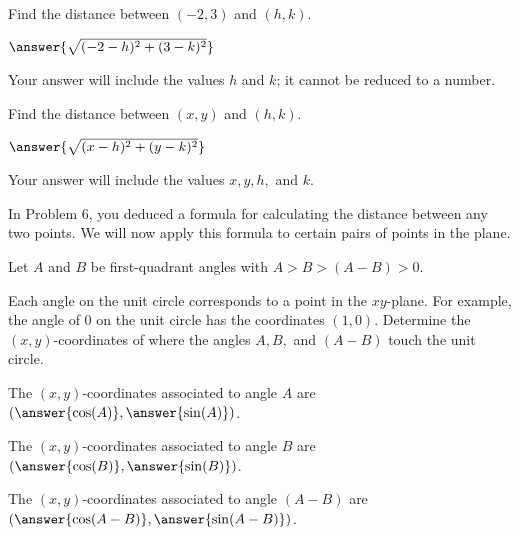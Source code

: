 \documentclass[number]{ximera}
\begin{document}
\begin{problem}
Find the distance between $(-2,3)$ and $(h,k)$.

$\answer{\sqrt{(-2-h)^2+(3-k)^2}}$

\begin{hint}
Your answer will include the values $h$ and $k$; it cannot be reduced to a number.
\end{hint}

\end{problem}

\begin{problem}
Find the distance between $(x,y)$ and $(h,k)$.

$\answer{\sqrt{(x-h)^2+(y-k)^2}}$

\begin{hint}
Your answer will include the values $x,y,h,$ and $k$.
\end{hint}

\end{problem}

In Problem 6, you deduced a formula for calculating the distance between any two points. We will now apply this formula to certain pairs of points in the plane.

Let $A$ and $B$ be first-quadrant angles with $A>B>(A-B)>0$.

\begin{image}
\end{image}

\begin{problem}
Each angle on the unit circle corresponds to a point in the $xy$-plane. For example, the angle of $0$ on the unit circle has the coordinates $(1,0)$. Determine the $(x,y)$-coordinates of where the angles $A,B,$ and $(A-B)$ touch the unit circle.

The $(x,y)$-coordinates associated to angle $A$ are $\left(\answer{\cos(A)},\answer{\sin(A)}\right)$.

The $(x,y)$-coordinates associated to angle $B$ are $\left(\answer{\cos(B)},\answer{\sin(B)}\right)$.

The $(x,y)$-coordinates associated to angle $(A-B)$ are $\left(\answer{\cos(A-B)},\answer{\sin(A-B)}\right)$.
\end{problem}
\end{document}
